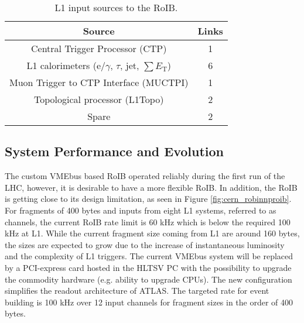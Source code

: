 \begin{table}[tbp]
\caption{L1 input sources to the RoIB.}
\label{tab:roib_links}
\smallskip
\centering
\begin{tabular}{|c|c|}
\hline
Source & Links\\
\hline
Central Trigger Processor (CTP)  & 1  \\
L1 calorimeters (e/$\gamma$, $\tau$, jet, $\sum E_\mathrm{T}$) & 6  \\
Muon Trigger to CTP Interface (MUCTPI) & 1  \\
Topological processor (L1Topo) & 2  \\
Spare & 2 \\
\hline
\end{tabular}
\end{table}

\subsection{System Performance and Evolution}\label{sec:roib_limit}

The custom VMEbus based RoIB operated reliably during the first run of the LHC, however, it is desirable to have a more flexible RoIB. 
In addition, the RoIB is getting close to its design limitation, as seen 
in Figure \ref{fig:cern_robinnproib}. For fragments of 400 bytes and inputs from eight L1 systems, referred to as channels, the current RoIB rate limit is 60 kHz which is below the required 100 kHz at 
L1. While the current fragment size coming from L1 are around 160 bytes, the sizes are expected to grow due to the increase of instantaneous 
luminosity and the complexity of L1 triggers. The current VMEbus system will be replaced by a PCI-express card hosted in the HLTSV PC with the 
possibility to upgrade the commodity hardware (e.g. ability to upgrade CPUs). 
The new configuration simplifies the readout architecture of ATLAS. The targeted rate for event building is 100 kHz over 12 input channels for 
fragment sizes in the order of 400 bytes.
